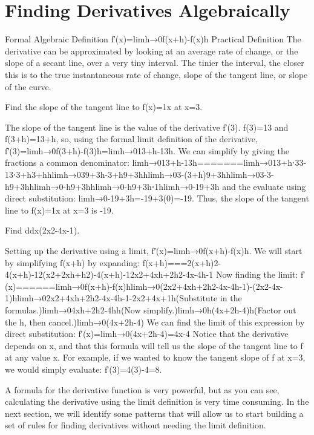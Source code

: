 \section{Finding Derivatives Algebraically}
\label{sec:algderiv}

Formal Algebraic Definition
f′(x)=limh→0f(x+h)-f(x)h
Practical Definition
The derivative can be approximated by looking at an average rate of change, or the slope of a secant line, over a very tiny interval. The tinier the interval, the closer this is to the true instantaneous rate of change, slope of the tangent line, or slope of the curve.

\begin{example}
Find the slope of the tangent line to f(x)=1x at x=3.

\begin{solution} The slope of the tangent line is the value of the derivative f′(3). f(3)=13 and f(3+h)=13+h, so, using the formal limit definition of the derivative,
f′(3)=limh→0f(3+h)-f(3)h=limh→013+h-13h.
We can simplify by giving the fractions a common denominator:
limh→013+h-13h=======limh→013+h⋅33-13⋅3+h3+hhlimh→039+3h-3+h9+3hhlimh→03-(3+h)9+3hhlimh→03-3-h9+3hhlimh→0-h9+3hhlimh→0-h9+3h⋅1hlimh→0-19+3h
and the evaluate using direct substitution:
limh→0-19+3h=-19+3(0)=-19.
Thus, the slope of the tangent line to f(x)=1x at x=3 is -19.
\end{solution}\end{example}

\begin{example}
Find ddx(2x2-4x-1).

\begin{solution} Setting up the derivative using a limit,
f′(x)=limh→0f(x+h)-f(x)h.
We will start by simplifying f(x+h) by expanding:
f(x+h)===2(x+h)2-4(x+h)-12(x2+2xh+h2)-4(x+h)-12x2+4xh+2h2-4x-4h-1
Now finding the limit:
f′(x)======limh→0f(x+h)-f(x)hlimh→0(2x2+4xh+2h2-4x-4h-1)-(2x2-4x-1)hlimh→02x2+4xh+2h2-4x-4h-1-2x2+4x+1h(Substitute in the formulas.)limh→04xh+2h2-4hh(Now simplify.)limh→0h(4x+2h-4)h(Factor out the h, then cancel.)limh→0(4x+2h-4)
We can find the limit of this expression by direct substitution:
f′(x)=limh→0(4x+2h-4)=4x-4
Notice that the derivative depends on x, and that this formula will tell us the slope of the tangent line to f at any value x. For example, if we wanted to know the tangent slope of f at x=3, we would simply evaluate: f′(3)=4(3)-4=8.
\end{solution}\end{example}
A formula for the derivative function is very powerful, but as you can see, calculating the derivative using the limit definition is very time consuming. In the next section, we will identify some patterns that will allow us to start building a set of rules for finding derivatives without needing the limit definition.
